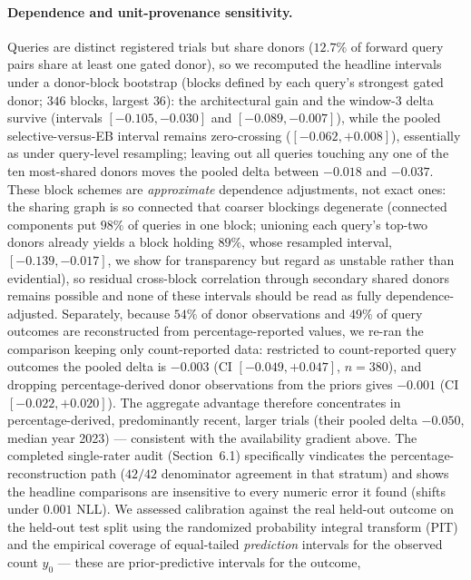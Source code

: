 \documentclass[11pt]{article}
\begin{document}
\paragraph{Dependence and unit-provenance sensitivity.} Queries are distinct
registered trials but share donors ($12.7\%$ of forward query pairs share at
least one gated donor), so we recomputed the headline intervals under a
donor-block bootstrap (blocks defined by each query's strongest gated
donor; $346$ blocks, largest $36$): the architectural gain and the
window-3 delta survive (intervals $[-0.105,-0.030]$ and
$[-0.089,-0.007]$), while the pooled
selective-versus-EB interval remains zero-crossing ($[-0.062,+0.008]$),
essentially as under query-level resampling; leaving out all queries touching
any one of the ten most-shared donors moves the pooled delta between
$-0.018$ and $-0.037$. These block schemes are \emph{approximate}
dependence adjustments, not exact ones: the sharing graph is so connected
that coarser blockings degenerate (connected components put $98\%$ of
queries in one block; unioning each query's top-two donors already yields a
block holding $89\%$, whose resampled interval, $[-0.139,-0.017]$, we show
for transparency but regard as unstable rather than evidential), so
residual cross-block correlation through secondary shared donors remains
possible and none of these intervals should be read as fully
dependence-adjusted. Separately, because $54\%$ of donor observations and
$49\%$ of query outcomes are reconstructed from percentage-reported values,
we re-ran the comparison keeping only count-reported data: restricted to
count-reported query outcomes the pooled delta is $-0.003$
(CI $[-0.049,+0.047]$, $n=380$), and dropping percentage-derived donor
observations from the priors gives $-0.001$ (CI $[-0.022,+0.020]$). The
aggregate advantage therefore concentrates in percentage-derived,
predominantly recent, larger trials (their pooled delta $-0.050$, median
year 2023) --- consistent with the availability gradient above. The completed single-rater audit
(Section~6.1) specifically vindicates the percentage-reconstruction path
($42/42$ denominator agreement in that stratum) and shows the headline
comparisons are insensitive to every numeric error it found (shifts under
$0.001$ NLL).
\label{sec:calib-results}
We assessed calibration against the real held-out outcome on the held-out test
split using the randomized probability integral transform (PIT) and the
empirical coverage of equal-tailed \emph{prediction} intervals for the
observed count $y_0$ --- these are prior-predictive intervals for the outcome,
\end{document}
